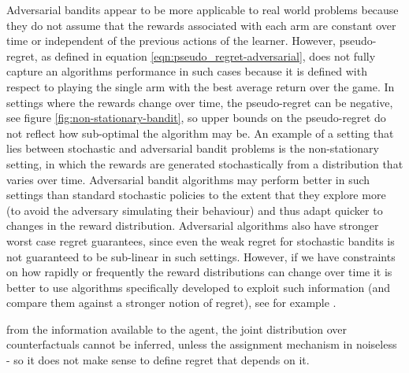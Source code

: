 \documentclass[11pt,a4paper,oneside]{book}
\theoremstyle{plain}
\theoremstyle{definition}
\begin{document}
Adversarial bandits appear to be more applicable to real world problems because they do not assume that the rewards associated with each arm are constant over time or independent of the previous actions of the learner. However, pseudo-regret, as defined in equation \ref{eqn:pseudo_regret-adversarial}, does not fully capture an algorithms performance in such cases because it is defined with respect to playing the single arm with the best average return over the game. In settings where the rewards change over time, the pseudo-regret can be negative, see figure \ref{fig:non-stationary-bandit}, so upper bounds on the pseudo-regret do not reflect how sub-optimal the algorithm may be. An example of a setting that lies between stochastic and adversarial bandit problems is the non-stationary setting, in which the rewards are generated stochastically from a distribution that varies over time. Adversarial bandit algorithms may perform better in such settings than standard stochastic policies to the extent that they explore more (to avoid the adversary simulating their behaviour) and thus adapt quicker to changes in the reward distribution. Adversarial algorithms also have stronger worst case regret guarantees, since even the weak regret for stochastic bandits is not guaranteed to be sub-linear in such settings. However, if we have constraints on how rapidly or frequently the reward distributions can change over time it is better to use algorithms specifically developed to exploit such information (and compare them against a stronger notion of regret), see for example \citep{garivier2008upper,Garivier2011a,Besbes2014}. 




from the information available to the agent, the joint distribution over counterfactuals cannot be inferred, unless the assignment mechanism in noiseless - so it does not make sense to define regret that depends on it. 
\end{document}
